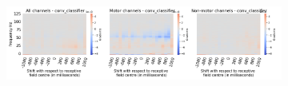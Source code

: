 \begin{figure}[!htpb]
\begin{subfigure}[b]{\textwidth}
   \includegraphics[width=1\linewidth]{img/appendix/C/m/vel/sbp0_m_shift_gradients_conv_classifier_all_kinds}
   \caption{}
   \label{fig:vel-shifting-grads-conv-classifier}
\end{subfigure}

\caption[]{}
\label{fig:vel-shifting-grads}
\end{figure}


